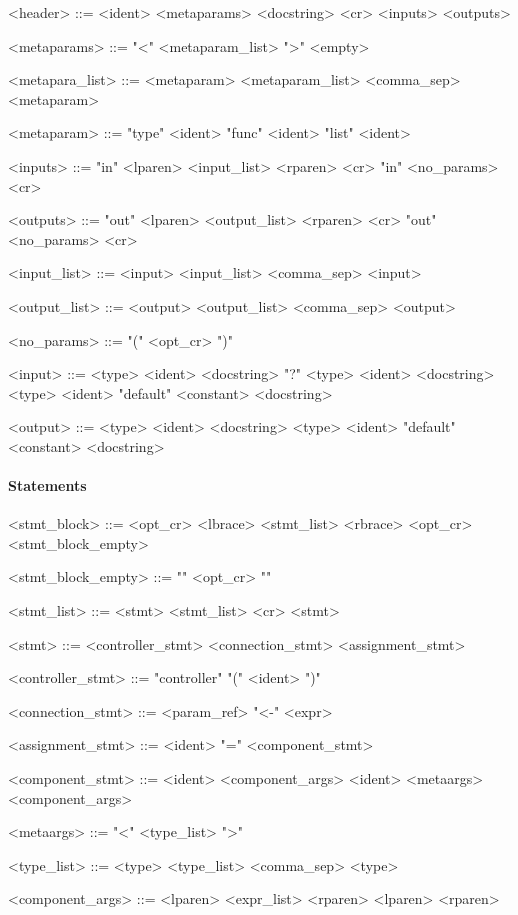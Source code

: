 \begin{grammar}
  <header> ::= <ident> <metaparams> <docstring> <cr> <inputs> <outputs>

  <metaparams> ::= "\textless" <metaparam_list> "\textgreater"
  \alt <empty>

  <metapara_list> ::= <metaparam>
  \alt <metaparam_list> <comma_sep> <metaparam>

  <metaparam> ::= "type" <ident>
  \alt "func" <ident>
  \alt "list" <ident>

  <inputs> ::= "in" <lparen> <input_list> <rparen> <cr>
  \alt "in" <no_params> <cr>

  <outputs> ::= "out" <lparen> <output_list> <rparen> <cr>
  \alt "out" <no_params> <cr>

  <input_list> ::= <input>
  \alt <input_list> <comma_sep> <input>

  <output_list> ::= <output>
  \alt <output_list> <comma_sep> <output>

  <no_params> ::= "(" <opt_cr> ")"

  <input> ::= <type> <ident> <docstring>
  \alt "?" <type> <ident> <docstring>
  \alt <type> <ident> "default" <constant> <docstring>

  <output> ::= <type> <ident> <docstring>
  \alt <type> <ident> "default" <constant> <docstring>
\end{grammar}


\paragraph{Statements}

\begin{grammar}
  <stmt_block> ::= <opt_cr> <lbrace> <stmt_list> <rbrace>
  \alt <opt_cr> <stmt_block_empty>

  <stmt_block_empty> ::= "{" <opt_cr> "}"

  <stmt_list> ::= <stmt>
  \alt <stmt_list> <cr> <stmt>

  <stmt> ::= <controller_stmt>
  \alt <connection_stmt>
  \alt <assignment_stmt>

  <controller_stmt> ::= "controller" "(" <ident> ")"

  <connection_stmt> ::= <param_ref> "\textless-" <expr>

  <assignment_stmt> ::= <ident> "=" <component_stmt>

  <component_stmt> ::= <ident> <component_args>
  \alt <ident> <metaargs> <component_args>

  <metaargs> ::= "\textless" <type_list> "\textgreater"

  <type_list> ::= <type>
  \alt <type_list> <comma_sep> <type>

  <component_args> ::= <lparen> <expr_list> <rparen>
  \alt <lparen> <rparen>
\end{grammar}


